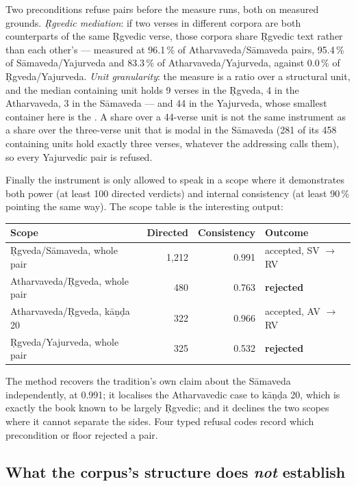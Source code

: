 Two preconditions refuse pairs before the measure runs, both on measured grounds.
\emph{\d{R}gvedic mediation}: if two verses in different corpora are both
counterparts of the same \d{R}gvedic verse, those corpora share \d{R}gvedic text
rather than each other's --- measured at 96.1\,\% of Atharvaveda/S\=amaveda pairs,
95.4\,\% of S\=amaveda/Yajurveda and 83.3\,\% of Atharvaveda/Yajurveda, against
0.0\,\% of \d{R}gveda/Yajurveda. \emph{Unit granularity}: the measure is a ratio over
a structural unit, and the median containing unit holds 9 verses in the \d{R}gveda,
4 in the Atharvaveda, 3 in the S\=amaveda --- and 44 in the Yajurveda, whose smallest
container here is the . A share over a 44-verse unit is not the same
instrument as a share over the three-verse unit that is modal in the S\=amaveda
(281 of its 458 containing units hold exactly three verses, whatever the addressing
calls them), so every Yajurvedic pair is
refused.

Finally the instrument is only allowed to speak in a scope where it demonstrates
both power (at least 100 directed verdicts) and internal consistency (at least
90\,\% pointing the same way). The scope table is the interesting output:

\begin{center}\small
\begin{tabular}{@{}lrrl@{}}
\toprule
Scope & Directed & Consistency & Outcome \\
\midrule
\d{R}gveda/S\=amaveda, whole pair & 1{,}212 & 0.991 & accepted, SV $\to$ RV \\
Atharvaveda/\d{R}gveda, whole pair & 480 & 0.763 & \textbf{rejected} \\
Atharvaveda/\d{R}gveda, k\=a\d{n}\d{d}a 20 & 322 & 0.966 & accepted, AV $\to$ RV \\
\d{R}gveda/Yajurveda, whole pair & 325 & 0.532 & \textbf{rejected} \\
\bottomrule
\end{tabular}
\end{center}

\noindent The method recovers the tradition's own claim about the S\=amaveda
independently, at 0.991; it localises the Atharvavedic case to k\=a\d{n}\d{d}a 20,
which is exactly the book known to be largely \d{R}gvedic; and it declines the two
scopes where it cannot separate the sides. Four typed refusal codes record which
precondition or floor rejected a pair.

\subsection{What the corpus's structure does \emph{not} establish}

